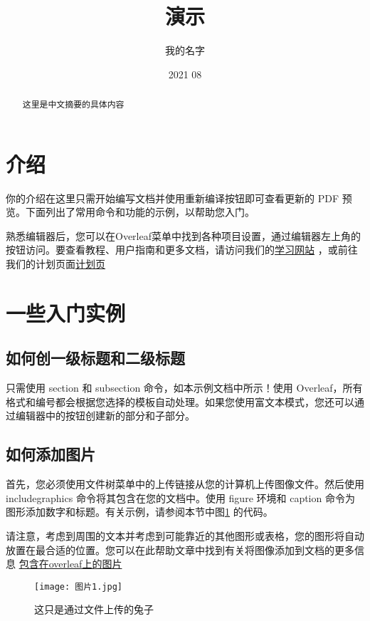 \documentclass{article}
\title{演示}
\author{我的名字}  %
\date{2021 08} %
\begin{document}
\maketitle     %

\begin{abstract}
    这里是中文摘要的具体内容
\end{abstract}   %
    

\section{介绍}
你的介绍在这里只需开始编写文档并使用重新编译按钮即可查看更新的 PDF 预览。下面列出了常用命令和功能的示例，以帮助您入门。

熟悉编辑器后，您可以在Overleaf菜单中找到各种项目设置，通过编辑器左上角的按钮访问。要查看教程、用户指南和更多文档，请访问我们的\href{https://www.overleaf.com/learn}{学习网站}%
，或前往我们的计划页面\href{https://www.overleaf.com/user/subscription/plans}{计划页}
\section{一些入门实例}
\subsection{如何创一级标题和二级标题}%
只需使用 section 和 subsection 命令，如本示例文档中所示！使用 Overleaf，所有格式和编号都会根据您选择的模板自动处理。如果您使用富文本模式，您还可以通过编辑器中的按钮创建新的部分和子部分。
\subsection{如何添加图片}
首先，您必须使用文件树菜单中的上传链接从您的计算机上传图像文件。然后使用 includegraphics 命令将其包含在您的文档中。使用 figure 环境和 caption 命令为图形添加数字和标题。有关示例，请参阅本节中图\ref{fig:rabbit} 的代码。

请注意，考虑到周围的文本并考虑到可能靠近的其他图形或表格，您的图形将自动放置在最合适的位置。您可以在此帮助文章中找到有关将图像添加到文档的更多信息 \href{https://www.overleaf.com/learn/how-to/Including_images_on_Overleaf}{包含在overleaf上的图片}
\begin{figure}
\centering
\texttt{[image: 图片1.jpg]}
\caption{\label{fig:rabbit}这只是通过文件上传的兔子}%
\end{figure}
\end{document}
